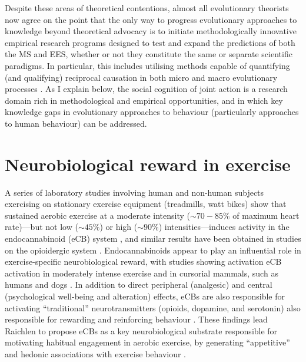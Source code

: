 Despite these areas of theoretical contentions, almost all evolutionary theorists now agree on the point that the only way to progress evolutionary approaches to knowledge beyond theoretical advocacy is to initiate methodologically innovative empirical research programs designed to test and expand the predictions of both the MS and EES, whether or not they constitute the same or separate scientific paradigms.  In particular, this includes utilising methods capable of quantifying (and qualifying) reciprocal causation in both micro and macro evolutionary processes  \citep{Wray2014,Laland2014,Laland2015,Svensson2017}.  As I explain below, the social cognition of joint action is a research domain rich in methodological and empirical opportunities, and in which key knowledge gaps in evolutionary approaches to behaviour (particularly approaches to human behaviour) can be addressed.














\section{Neurobiological reward in exercise\label{sect:neuroRewardGE}}
A series of laboratory studies involving human and non-human subjects exercising on stationary exercise equipment (treadmills, watt bikes) show that sustained aerobic exercise at a moderate intensity ($\sim70-85\%$ of maximum heart rate)---but not low ($\sim45\%$) or high ($\sim90\%$) intensities---induces activity in the endocannabinoid (eCB) system \citep{Raichlen2013}, and similar results have been obtained in studies on the opioidergic system \citep{Boecker2008}.  Endocannabinoids appear to play an influential role in exercise-specific neurobiological reward, with studies showing activation eCB activation in moderately intense exercise and in cursorial mammals, such as humans and dogs \citep[but not non-cursorial mammals, e.g., ferrets;][]{Raichlen2012}.  In addition to direct peripheral (analgesic) and central (psychological well-being and alteration) effects, eCBs are also responsible for activating ``traditional'' neurotransmitters (opioids, dopamine, and serotonin) also responsible for rewarding and reinforcing behaviour \citep{Sparling2003}.  These findings lead Raichlen to propose eCBs as a key neurobiological substrate responsible for motivating habitual engagement in aerobic exercise, by generating ``appetitive'' and hedonic associations with exercise behaviour \citep{Raichlen2012}.







